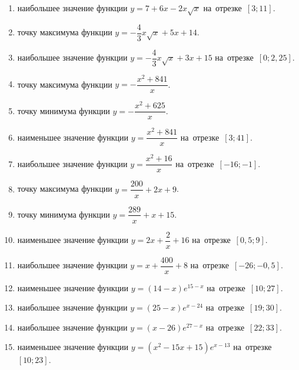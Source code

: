 \documentclass[a4paper,10pt]{article}
\begin{document}
\begin{enumerate}
\item {} наибольшее значение функции $y=7+6x -2x\sqrt{x}$ на~отрезке~$\left[3;11\right]$.

\item {} точку максимума функции $y=-\dfrac{4}{3}x\sqrt{x} +5x+14$.

\item {} наибольшее значение функции $y=-\dfrac{4}{3}x\sqrt{x} +3x+15$ на~отрезке~$\left[0;2,25\right]$.

\item {} точку максимума функции $y=-\dfrac{x^2 +841}{x}$.

\item {} точку минимума функции $y=-\dfrac{x^2 +625}{x}$.

\item {} наименьшее значение функции $y=\dfrac{x^2 +841}{x}$ на~отрезке~$\left[3;41\right]$.

\item {} наибольшее значение функции $y=\dfrac{x^2 +16}{x}$ на~отрезке~$\left[-16;-1\right]$.

\item {} точку максимума функции $y=\dfrac{200}{x} +2x+9$.

\item {} точку минимума функции $y=\dfrac{289}{x} +x+15$.

\item {} наименьшее значение функции $y=2x+\dfrac{2}{x} +16$ на~отрезке~$\left[0,5;9\right]$.

\item {} наибольшее значение функции $y=x+\dfrac{400}{x} +8$ на~отрезке~$\left[-26;-0,5\right]$.

\item {} наименьшее значение функции $y=\left(14-x\right)e^{15-x}$ на~отрезке~$\left[10;27\right]$.

\item {} наибольшее значение функции $y=\left(25-x\right)e^{x-24}$ на~отрезке~$\left[19;30\right]$.

\item {} наибольшее значение функции $y=\left(x-26\right)e^{27-x}$ на~отрезке~$\left[22;33\right]$.

\item {} наименьшее значение функции $y=\left(x^2 -15x +15\right)e^{x -13}$ на~отрезке~$\left[10;23\right]$.


\end{enumerate}
\end{document}
